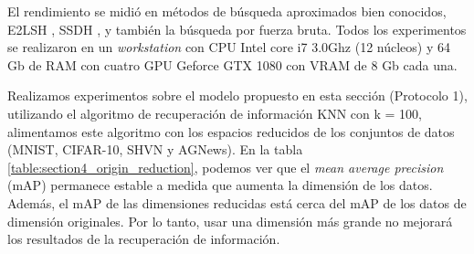 El rendimiento se midió en métodos de búsqueda aproximados bien conocidos, E2LSH \cite{multiprobe}, SSDH \cite{kLin:DH}, y también la búsqueda por fuerza bruta. Todos los experimentos se realizaron en un \textit{workstation} con CPU Intel core i7 3.0Ghz (12 núcleos) y 64 Gb de RAM  con cuatro GPU Geforce GTX 1080 con VRAM de 8 Gb cada una.

Realizamos experimentos sobre el modelo propuesto en esta sección (Protocolo 1), utilizando el algoritmo de recuperación de información KNN con k = 100, alimentamos este algoritmo con los espacios reducidos de los conjuntos de datos (MNIST, CIFAR-10, SHVN y AGNews). En la tabla \ref{table:section4_origin_reduction}, podemos ver que el \textit{mean average precision} (mAP) permanece estable a medida que aumenta la dimensión de los datos. Además, el mAP de las dimensiones reducidas está cerca del mAP de los datos de dimensión originales. Por lo tanto, usar una dimensión más grande no mejorará los resultados de la recuperación de información.

